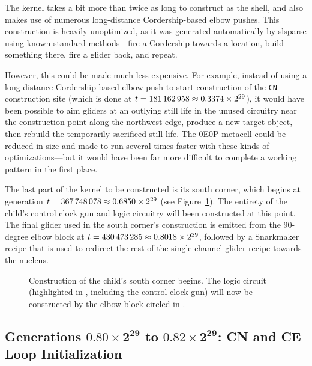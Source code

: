 The kernel takes a bit more than twice as long to construct as the shell, and also makes use of numerous long-distance Cordership-based elbow pushes. This construction is heavily unoptimized, as it was generated automatically by slsparse using known standard methods---fire a Cordership towards a location, build something there, fire a glider back, and repeat.

However, this could be made much less expensive. For example, instead of using a long-distance Cordership-based elbow push to start construction of the \texttt{CN} construction site (which is done at $t = 181{\,}162{\,}958 \approx 0.3374 \times 2^{29}$), it would have been possible to aim gliders at an outlying still life in the unused circuitry near the construction point along the northwest edge, produce a new target object, then rebuild the temporarily sacrificed still life. The 0E0P metacell could be reduced in size and made to run several times faster with these kinds of optimizations---but it would have been far more difficult to complete a working pattern in the first place.

The last part of the kernel to be constructed is its south corner, which begins at generation $t = 367{\,}748{\,}078 \approx 0.6850 \times 2^{29}$ (see Figure~\ref{fig:0e0p_timeline_367748078}). The entirety of the child's control clock gun and logic circuitry will been constructed at this point. The final glider used in the south corner's construction is emitted from the 90-degree elbow block at $t = 430{\,}473{\,}285 \approx 0.8018 \times 2^{29}$, followed by a Snarkmaker recipe that is used to redirect the rest of the single-channel glider recipe towards the nucleus.

\begin{figure}[!htb]
	\centering
	\caption{Construction of the child's south corner begins. The logic circuit (highlighted in , including the control clock gun) will now be constructed by the elbow block circled in .}
	\label{fig:0e0p_timeline_367748078}
\end{figure}


\subsection{Generations $\mathbf{0.80 \times 2^{29}}$ to $\mathbf{0.82 \times 2^{29}}$: CN and CE Loop Initialization}\label{sec:0e0p_timeline_nucleus_nw}

